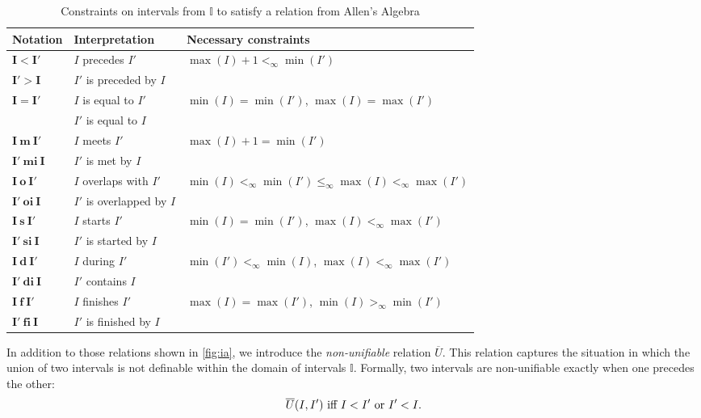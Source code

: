 \begin{table}[t]
    \centering
    \begin{tabular}{|l|l|l|}
    \hline
        Notation& Interpretation  & Necessary constraints  \\
        \hline
        $\boldsymbol{I< I'}$  & $I$ precedes $I'$  & $\max(I)+1 <_\infty \min(I')$\\
        $\boldsymbol{I' > I}$  & $I'$ is preceded by $I$  &  \\
        \hline
        $\boldsymbol{I = I'}$  & $I$ is equal to $I'$  & $\min(I) = \min(I')$, $\max(I) = \max(I')$ \\
        & $I'$ is equal to $I$  & \\
        \hline
        $\boldsymbol{I~m~I'}$  & $I$ meets $I'$  & $\max(I)+1 =\min(I')$ \\
        $\boldsymbol{I'~mi~I}$  & $I'$ is met by $I$  &  \\
        \hline
        $\boldsymbol{I~o~I'}$  & $I$ overlaps with $I'$  & $\min(I) <_\infty \min(I') \leq_\infty \max(I) <_\infty \max(I')$ \\
        $\boldsymbol{I'~oi~I}$  & $I'$ is overlapped by $I$  & \\
        \hline
        $\boldsymbol{I~s~I'}$  & $I$ starts $I'$  & $\min(I) = \min(I')$, $\max(I) <_\infty \max(I')$ \\
        $\boldsymbol{I'~si~I}$  & $I'$ is started by $I$  &  \\
        \hline
        $\boldsymbol{I~d~I'}$  & $I$ during $I'$  & $\min(I') <_\infty \min(I)$, $\max(I) <_\infty \max(I')$ \\
        $\boldsymbol{I'~di~I}$  & $I'$ contains $I$  & \\
        \hline
        $\boldsymbol{I~f~I'}$  & $I$ finishes $I'$  & $\max(I) = \max(I')$, $\min(I) >_\infty \min(I')$ \\
        $\boldsymbol{I'~fi~I}$  & $I'$ is finished by $I$  &  \\
        \hline
    \end{tabular}
	    \caption{Constraints on intervals from $\mathbb{I}$ to satisfy a relation from  Allen's Algebra }
	    \label{tab:IAdesc}
\end{table}


In addition to those relations shown in \ref{fig:ia}, we introduce the \emph{non-unifiable} relation $\overline{U}$. This relation captures the situation in which the union of two intervals is not definable within the domain of intervals $\mathbb{I}$. Formally, two intervals are non-unifiable exactly when one precedes the other:
$$\overline{U}(I,I') \text{ iff } I < I' \text{ or } I' < I.$$


